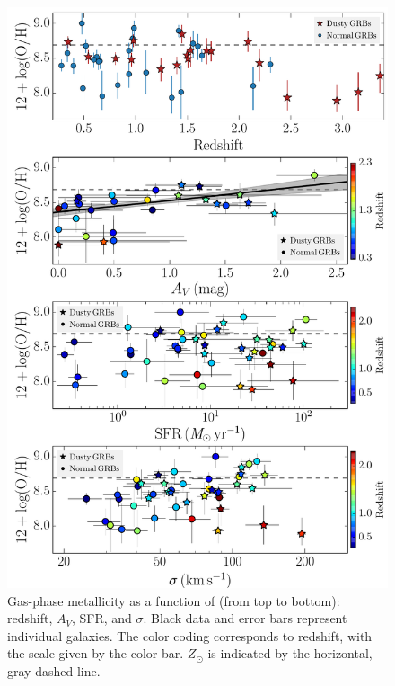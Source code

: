 \documentclass[traditabstract, longauth]{aa}
\begin{document}
\begin{figure}
\includegraphics[angle=0, width=0.99\columnwidth]{Figs/Z_z.pdf}
\caption{Gas-phase metallicity as a function of (from top to bottom): redshift, $A_V$, SFR, and $\sigma$. Black data and error bars represent individual galaxies. The color coding corresponds to redshift, with the scale given by the color bar. $Z_{\odot}$ is indicated by the horizontal, gray dashed line.}
\label{fig:zprop}
\end{figure}
\end{document}
